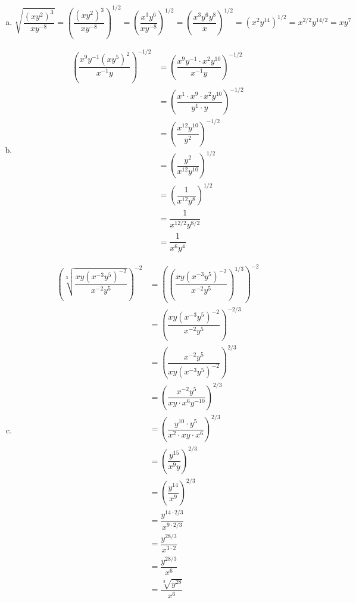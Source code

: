 \documentclass[11pt,letterpaper]{article}
\begin{document}
\sol 
\begin{enumerate}[(a)]
\item 
	\[
	\sqrt{\dfrac{(x y^2)^3}{x y^{-8}}}= \left( \dfrac{(x y^2)^3}{x y^{-8}} \right)^{1/2}= \left( \dfrac{x^3 y^6}{x y^{-8}} \right)^{1/2}= \left( \dfrac{x^3 y^6 y^8}{x} \right)^{1/2}= (x^2 y^{14})^{1/2}= x^{2/2} y^{14/2}= x y^7
	\] \pspace

\item 
	\[
	\begin{aligned}
	\left( \dfrac{x^9 y^{-1} (x y^5)^2}{x^{-1} y} \right)^{-1/2}&= \left( \dfrac{x^9 y^{-1} \cdot x^2 y^{10} }{x^{-1} y} \right)^{-1/2} \\[0.3cm]
	&= \left( \dfrac{x^1 \cdot x^9 \cdot x^2 y^{10} }{y^1 \cdot y} \right)^{-1/2} \\[0.3cm]
	&= \left( \dfrac{x^{12} y^{10}}{y^2} \right)^{-1/2} \\[0.3cm]
	&= \left( \dfrac{y^2}{x^{12} y^{10}} \right)^{1/2} \\[0.3cm]
	&= \left( \dfrac{1}{x^{12} y^8} \right)^{1/2} \\[0.3cm]
	&= \dfrac{1}{x^{12/2} y^{8/2}} \\[0.3cm]
	&= \dfrac{1}{x^6 y^4}
	\end{aligned}
	\] \pspace

\item 
	\[
	\begin{aligned}
	\left( \sqrt[3]{\dfrac{xy (x^{-3} y^5)^{-2}}{x^{-2} y^5}} \right)^{-2}&= \left( \left( \dfrac{xy (x^{-3} y^5)^{-2}}{x^{-2} y^5} \right)^{1/3} \right)^{-2} \\[0.3cm]
	&= \left( \dfrac{xy (x^{-3} y^5)^{-2}}{x^{-2} y^5} \right)^{-2/3} \\[0.3cm]
	&= \left( \dfrac{x^{-2} y^5}{xy (x^{-3} y^5)^{-2}} \right)^{2/3} \\[0.3cm]
	&= \left( \dfrac{x^{-2} y^5}{xy \cdot x^6 y^{-10}} \right)^{2/3} \\[0.3cm]
	&= \left( \dfrac{y^{10} \cdot y^5}{x^2 \cdot xy \cdot x^6} \right)^{2/3} \\[0.3cm]
	&= \left( \dfrac{y^{15}}{x^9 y} \right)^{2/3} \\[0.3cm]
	&= \left( \dfrac{y^{14}}{x^9} \right)^{2/3} \\[0.3cm]
	&= \dfrac{y^{14 \cdot 2/3}}{x^{9 \cdot 2/3}} \\[0.3cm]
	&= \dfrac{y^{28/3}}{x^{3 \cdot 2}} \\[0.3cm]
	&= \dfrac{y^{28/3}}{x^6} \\[0.3cm]
	&= \dfrac{\sqrt[3]{y^{28}}}{x^6}
	\end{aligned}
	\]
\end{enumerate}
\end{document}
